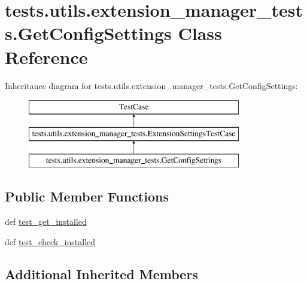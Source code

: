 \hypertarget{classtests_1_1utils_1_1extension__manager__tests_1_1GetConfigSettings}{\section{tests.\-utils.\-extension\-\_\-manager\-\_\-tests.\-Get\-Config\-Settings Class Reference}
\label{classtests_1_1utils_1_1extension__manager__tests_1_1GetConfigSettings}
}
Inheritance diagram for tests.\-utils.\-extension\-\_\-manager\-\_\-tests.\-Get\-Config\-Settings\-:\begin{figure}[H]
\begin{center}
\leavevmode
\includegraphics[height=3.000000cm]{classtests_1_1utils_1_1extension__manager__tests_1_1GetConfigSettings}
\end{center}
\end{figure}
\subsection*{Public Member Functions}
\begin{DoxyCompactItemize}
\item 
def \hyperlink{classtests_1_1utils_1_1extension__manager__tests_1_1GetConfigSettings_abb00849dbf033d220046921187102261}{test\-\_\-get\-\_\-installed}
\item 
def \hyperlink{classtests_1_1utils_1_1extension__manager__tests_1_1GetConfigSettings_ad7405dd268be73fd701a305f057b6443}{test\-\_\-check\-\_\-installed}
\end{DoxyCompactItemize}
\subsection*{Additional Inherited Members}



